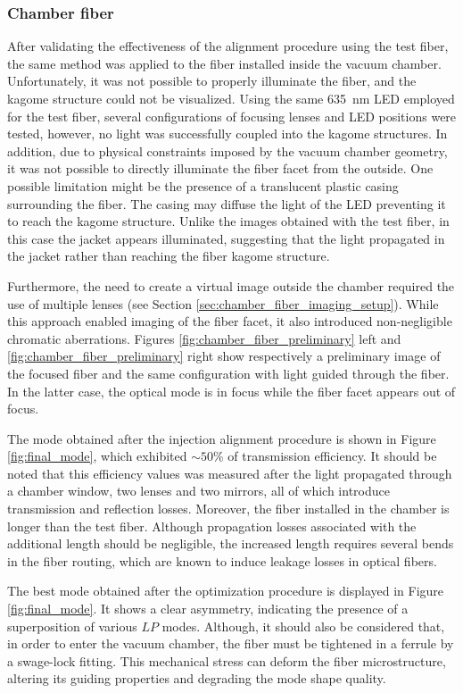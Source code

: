 \subsubsection{Chamber fiber}\label{chamber_fiber_alignement}
After validating the effectiveness of the alignment procedure using the test fiber, the same method was applied to the fiber installed inside the vacuum chamber.
Unfortunately, it was not possible to properly illuminate the fiber, and the kagome structure could not be visualized. Using the same 635~nm LED employed for the test fiber, several configurations of focusing lenses and LED positions were tested, however, no light was successfully coupled into the kagome structures. In addition, due to physical constraints imposed by the vacuum chamber geometry, it was not possible to directly illuminate the fiber facet from the outside.
One possible limitation might be the presence of a translucent plastic casing surrounding the fiber. The casing may diffuse the light of the LED preventing it to reach the kagome structure. Unlike the images obtained with the test fiber, in this case the jacket appears illuminated, suggesting that the light propagated in the jacket rather than reaching the fiber kagome structure.

Furthermore, the need to create a virtual image outside the chamber required the use of multiple lenses (see Section \ref{sec:chamber_fiber_imaging_setup}). While this approach enabled imaging of the fiber facet, it also introduced non-negligible chromatic aberrations. Figures \ref{fig:chamber_fiber_preliminary} left and \ref{fig:chamber_fiber_preliminary} right show respectively a preliminary image of the focused fiber and the same configuration with light guided through the fiber. In the latter case, the optical mode is in focus while the fiber facet appears out of focus.

The mode obtained after the injection alignment procedure is shown in Figure \ref{fig:final_mode}, which exhibited $\sim50\%$ of transmission efficiency. It should be noted that this efficiency values was measured after the light propagated through a chamber window, two lenses and two mirrors, all of which introduce transmission and reflection losses. Moreover, the fiber installed in the chamber is longer than the test fiber. Although propagation losses associated with the additional length should be negligible, the increased length requires several bends in the fiber routing, which are known to induce leakage losses in optical fibers.

The best mode obtained after the optimization procedure is displayed in Figure \ref{fig:final_mode}. It shows a clear asymmetry, indicating the presence of a superposition of various $LP$ modes. Although, it should also be considered that, in order to enter the vacuum chamber, the fiber must be tightened in a ferrule by a swage-lock fitting. This mechanical stress can deform the fiber microstructure, altering its guiding properties and degrading the mode shape quality.

